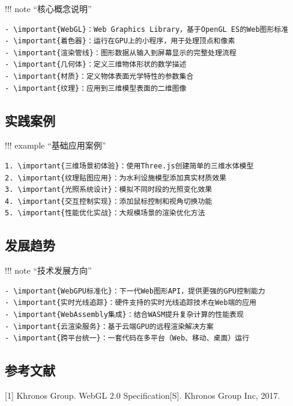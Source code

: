 !!! note ``核心概念说明''

\begin{verbatim}
- \important{WebGL}：Web Graphics Library，基于OpenGL ES的Web图形标准
- \important{着色器}：运行在GPU上的小程序，用于处理顶点和像素
- \important{渲染管线}：图形数据从输入到屏幕显示的完整处理流程
- \important{几何体}：定义三维物体形状的数学描述
- \important{材质}：定义物体表面光学特性的参数集合
- \important{纹理}：应用到三维模型表面的二维图像
\end{verbatim}

\hypertarget{ux5b9eux8df5ux6848ux4f8b}{%
\subsection{实践案例}\label{ux5b9eux8df5ux6848ux4f8b}}

!!! example ``基础应用案例''

\begin{verbatim}
1. \important{三维场景初体验}：使用Three.js创建简单的三维水体模型
2. \important{纹理贴图应用}：为水利设施模型添加真实材质效果
3. \important{光照系统设计}：模拟不同时段的光照变化效果
4. \important{交互控制实现}：添加鼠标控制和视角切换功能
5. \important{性能优化实战}：大规模场景的渲染优化方法
\end{verbatim}

\hypertarget{ux53d1ux5c55ux8d8bux52bf}{%
\subsection{发展趋势}\label{ux53d1ux5c55ux8d8bux52bf}}

!!! note ``技术发展方向''

\begin{verbatim}
- \important{WebGPU标准化}：下一代Web图形API，提供更强的GPU控制能力
- \important{实时光线追踪}：硬件支持的实时光线追踪技术在Web端的应用
- \important{WebAssembly集成}：结合WASM提升复杂计算的性能表现
- \important{云渲染服务}：基于云端GPU的远程渲染解决方案
- \important{跨平台统一}：一套代码在多平台（Web、移动、桌面）运行
\end{verbatim}

\hypertarget{ux53c2ux8003ux6587ux732e}{%
\subsection{参考文献}\label{ux53c2ux8003ux6587ux732e}}

{[}1{]} Khronos Group. WebGL 2.0 Specification{[}S{]}. Khronos Group Inc, 2017.


